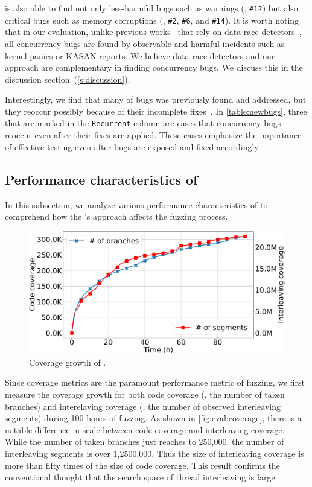 \sys is also able to find not only less-harmful bugs such as warnings
(\eg, \texttt{\#12}) but also critical bugs such as memory corruptions
(\eg, \texttt{\#2}, \texttt{\#6}, and \texttt{\#14}).
%
It is worth noting that in our evaluation, unlike previous
works~\cite{snowboard, krace} that rely on data race
detectors~\cite{kcsan, tsan}, all concurrency bugs are found by
observable and harmful incidents such as kernel panics or KASAN
reports.
%
\dr{}
We believe data race detectors and our approach are complementary in
finding concurrency bugs. We discuss this in the discussion
section~(\autoref{s:discussion}).

Interestingly, we find that many of bugs was previously found and
addressed, but they reoccur possibly because of their incomplete
fixes~\cite{learningfrommistakes}.
%
In \autoref{table:newbugs}, three that are marked in the
\texttt{Recurrent} column are cases that concurrency bugs reoccur even
after their fixes are applied.
%
These cases emphasize the importance of effective testing even after
bugs are exposed and fixed accordingly.






\subsection{Performance characteristics of \sys}
\label{ss:characteristics}

In this subsection, we analyze various performance characteristics of
\sys to comprehend how the \sys's approach affects the fuzzing
process.

%
\begin{figure}[t]
  \centering
  \includegraphics[width=\linewidth]{fig/coverage_graph-crop.pdf}
  \caption{Coverage growth of \sys.}
  \label{fig:eval:coverage}
\end{figure}
%
Since coverage metrics are the paramount performance metric of
fuzzing, we first measure the coverage growth for both code coverage
(\ie, the number of taken branches) and interelaving coverage (\ie,
the number of observed interleaving segments) during 100 hours of
fuzzing.
%
As shown in \autoref{fig:eval:coverage}, there is a notable difference
in scale between code coverage and interleaving coverage.
%
While the number of taken branches just reaches to 250,000, the number
of interleaving segments is over 1,2500,000. Thus the size of
interleaving coverage is more than fifty times of the size of code
coverage.
%
This result confirms the conventional thought that the search space of
thread interleaving is large.
%


